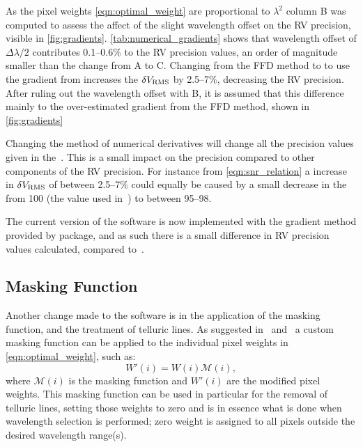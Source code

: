 As the pixel weights \cref{eqn:optimal_weight} are proportional to \({\lambda}^{2}\) column B was computed to assess the affect of the slight wavelength offset on the {RV} precision, visible in \cref{fig:gradients}.
\cref{tab:numerical_gradients} shows that wavelength offset of \(\Delta\lambda/2\) contributes 0.1--0.6\% to the RV precision values, an order of magnitude smaller than the change from A to C.
Changing from the {FFD} method to \npgradient{} to use the gradient from \numpy{} increases the \(\delta V_{\textrm{RMS}}\) by 2.5--7\%, decreasing the {RV} precision.
After ruling out the wavelength offset with B, it is assumed that this difference mainly to the over-estimated gradient from the {FFD} method, shown in \cref{fig:gradients}

Changing the method of numerical derivatives will change all the precision values given in the~\citet{figueira_radial_2016}.
This is a small impact on the precision compared to other components of the {RV} precision.
For instance from \cref{eqn:snr_relation} a increase in \(\delta V_{\textrm{RMS}}\) of between 2.5--7\% could equally be caused by a small decrease in the \snr{} from 100 (the value used in~\citet{figueira_radial_2016}) to between 95--98.

The current version of the software is now implemented with the gradient method provided by \numpy{} package, and as such there is a small difference in {RV} precision values calculated, compared to~\citep{figueira_radial_2016}.

\subsection{Masking Function}
\label{subsec:masking_function}
Another change made to the software is in the application of the masking function, and the treatment of telluric lines.
As suggested in~\citet{connes_absolute_1985} and~\citet{bouchy_fundamental_2001} a custom masking function can be applied to the individual pixel weights in \cref{eqn:optimal_weight}, such as:
\begin{equation}
W'(i) = W(i)\mathcal{M}(i),\label{eqn:mask_function}
\end{equation}
where \(\mathcal{M}(i)\) is the masking function and \(W'(i)\) are the modified pixel weights.
This masking function can be used in particular for the removal of telluric lines, setting those weights to zero and is in essence what is done when wavelength selection is performed; zero weight is assigned to all pixels outside the desired wavelength range(s).

